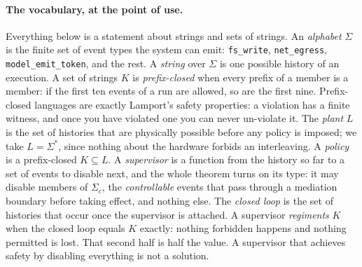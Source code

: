 \documentclass[11pt,a4paper]{article}
\theoremstyle{definition}
\theoremstyle{remark}
\begin{document}
\paragraph{The vocabulary, at the point of use.}
Everything below is a statement about strings and sets of strings. An \emph{alphabet}
$\Sigma$ is the finite set of event types the system can emit: \texttt{fs\_write},
\texttt{net\_egress}, \texttt{model\_emit\_token}, and the rest. A \emph{string} over $\Sigma$
is one possible history of an execution. A set of strings $K$ is \emph{prefix-closed} when
every prefix of a member is a member: if the first ten events of a run are allowed, so are
the first nine. Prefix-closed languages are exactly Lamport's safety properties: a violation
has a finite witness, and once you have violated one you can never un-violate it. The
\emph{plant} $L$ is the set of histories that are physically possible before any policy is
imposed; we take $L = \Sigma^{*}$, since nothing about the hardware forbids an interleaving.
A \emph{policy} is a prefix-closed $K \subseteq L$. A \emph{supervisor} is a function from the
history so far to a set of events to disable next, and the whole theorem turns on its type:
it may disable members of $\Sigma_c$, the \emph{controllable} events that pass through a
mediation boundary before taking effect, and nothing else. The \emph{closed loop} is the set
of histories that occur once the supervisor is attached. A supervisor \emph{regiments} $K$
when the closed loop equals $K$ exactly: nothing forbidden happens and nothing permitted is
lost. That second half is half the value. A supervisor that achieves safety by disabling
everything is not a solution.
\end{document}
